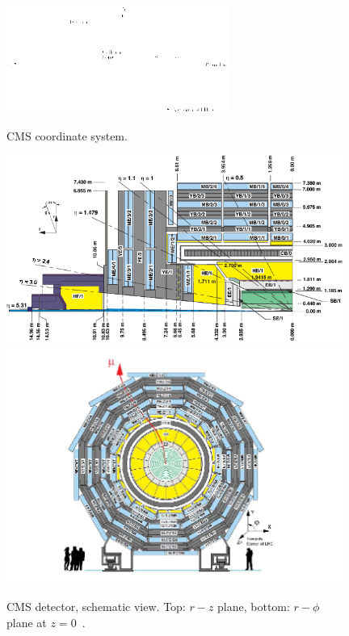 \begin{figure}[htb]
  \begin{center}
    {\includegraphics[width=0.65\textwidth]{../figs/Exp/CMScoord.png}}
    \caption{CMS coordinate system. }
    \label{fig:CMScoord}
  \end{center}
\end{figure}

\begin{figure}[htb]
  \begin{center}
    {\includegraphics[width=0.98\textwidth]{../figs/Exp/CMSview1.png}\\
     \includegraphics[width=0.98\textwidth]{../figs/Exp/CMSview.png}}
    \caption{CMS detector, schematic view. Top: $r-z$ plane, bottom: $r-\phi$ plane at $z=0$~\cite{ref_CMSschemView}. }
    \label{fig:CMSschemView}
  \end{center}
\end{figure}

